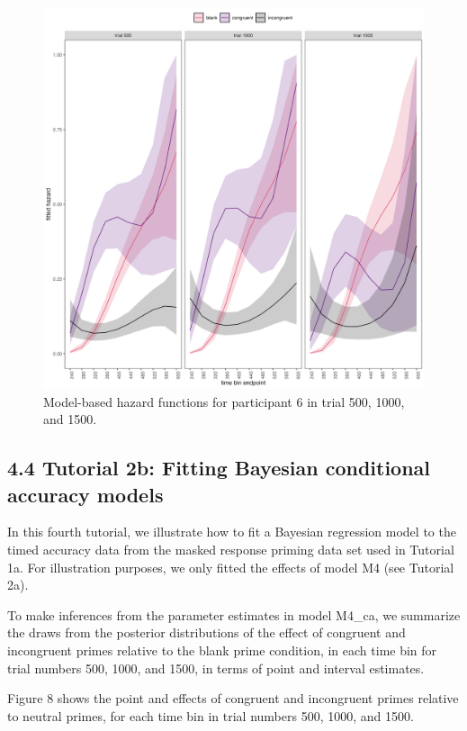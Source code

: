 \documentclass[
  man,floatsintext]{apa6}
\begin{document}
\begin{figure}[H]

{\centering \includegraphics[width=0.8\linewidth,height=0.67\textheight,]{../Tutorial_2_Bayesian/figures/M4effects_subject6} 

}

\caption{Model-based hazard functions for participant 6 in trial 500, 1000, and 1500.}\label{fig:plot-hazard-subject6}
\end{figure}

\subsection{4.4 Tutorial 2b: Fitting Bayesian conditional accuracy models}\label{tutorial-2b-fitting-bayesian-conditional-accuracy-models}

In this fourth tutorial, we illustrate how to fit a Bayesian regression model to the timed accuracy data from the masked response priming data set used in Tutorial 1a. For illustration purposes, we only fitted the effects of model M4 (see Tutorial 2a).

To make inferences from the parameter estimates in model M4\_ca, we summarize the draws from the posterior distributions of the effect of congruent and incongruent primes relative to the blank prime condition, in each time bin for trial numbers 500, 1000, and 1500, in terms of point and interval estimates.

Figure 8 shows the point and effects of congruent and incongruent primes relative to neutral primes, for each time bin in trial numbers 500, 1000, and 1500.
\end{document}
